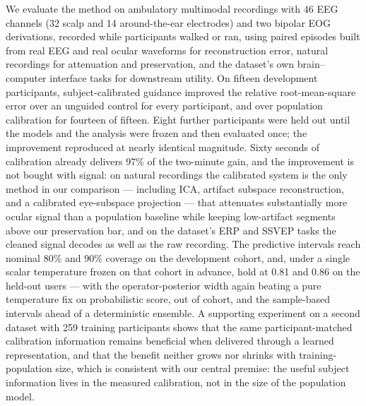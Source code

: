 We evaluate the method on ambulatory multimodal recordings with 46 EEG channels (32 scalp and 14 around-the-ear electrodes) and two bipolar EOG derivations, recorded while participants walked or ran, using paired episodes built from real EEG and real ocular waveforms for reconstruction error, natural recordings for attenuation and preservation, and the dataset's own brain--computer interface tasks for downstream utility. On fifteen development participants, subject-calibrated guidance improved the relative root-mean-square error over an unguided control for every participant, and over population calibration for fourteen of fifteen. Eight further participants were held out until the models and the analysis were frozen and then evaluated once; the improvement reproduced at nearly identical magnitude. Sixty seconds of calibration already delivers 97\% of the two-minute gain, and the improvement is not bought with signal: on natural recordings the calibrated system is the only method in our comparison --- including ICA, artifact subspace reconstruction, and a calibrated eye-subspace projection --- that attenuates substantially more ocular signal than a population baseline while keeping low-artifact segments above our preservation bar, and on the dataset's ERP and SSVEP tasks the cleaned signal decodes as well as the raw recording. The predictive intervals reach nominal 80\% and 90\% coverage on the development cohort, and, under a single scalar temperature frozen on that cohort in advance, hold at 0.81 and 0.86 on the held-out users --- with the operator-posterior width again beating a pure temperature fix on probabilistic score, out of cohort, and the sample-based intervals ahead of a deterministic ensemble. A supporting experiment on a second dataset with 259 training participants shows that the same participant-matched calibration information remains beneficial when delivered through a learned representation, and that the benefit neither grows nor shrinks with training-population size, which is consistent with our central premise: the useful subject information lives in the measured calibration, not in the size of the population model.

